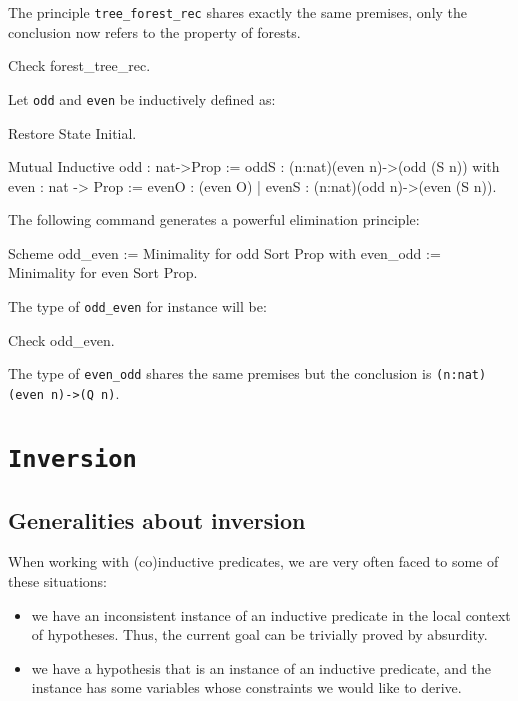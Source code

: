 \begin{coq_example*}
The principle {\tt tree\_forest\_rec} shares exactly the same
premises, only the conclusion now refers to the property of forests.

\begin{coq_example}
Check forest_tree_rec.
\end{coq_example}


Let {\tt odd} and {\tt even} be inductively defined as:

\begin{coq_eval}
Restore State Initial.
\end{coq_eval}

\begin{coq_example*}
Mutual Inductive odd : nat->Prop := 
    oddS : (n:nat)(even n)->(odd (S n))
with even : nat -> Prop := 
    evenO : (even O) 
  | evenS : (n:nat)(odd n)->(even (S n)).  
\end{coq_example*}

The following command generates a powerful elimination
principle:

\begin{coq_example*}
Scheme odd_even := Minimality for odd Sort Prop
with   even_odd := Minimality for even Sort Prop.
\end{coq_example*}

The type of {\tt odd\_even} for instance will be:

\begin{coq_example}
Check odd_even.
\end{coq_example}

The type of {\tt even\_odd} shares the same premises but the
conclusion is {\tt (n:nat)(even n)->(Q n)}.


\section{{\tt Inversion}}
\label{Inversion-examples}

\subsection*{Generalities about inversion}

When working with (co)inductive predicates, we are very often faced to
some of these situations:
\begin{itemize}
\item we have an inconsistent instance of an inductive predicate in the
  local context of hypotheses. Thus, the current goal can be trivially
  proved by absurdity. 
\item we have a hypothesis that is an instance of an inductive
  predicate, and the instance has some variables whose constraints we
  would like to derive.
\end{itemize}


\end{coq_example*}
